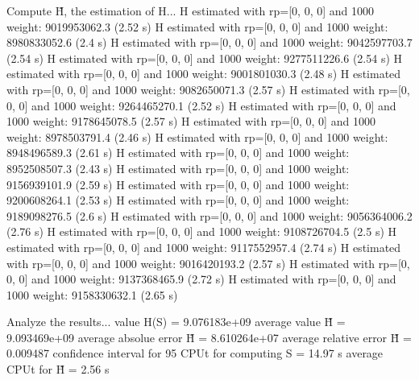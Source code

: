 Compute H̃, the estimation of H...
  H estimated with rp=[0, 0, 0] and 1000 weight:  9019953062.3  (2.52 s)
  H estimated with rp=[0, 0, 0] and 1000 weight:  8980833052.6  (2.4 s)
  H estimated with rp=[0, 0, 0] and 1000 weight:  9042597703.7  (2.54 s)
  H estimated with rp=[0, 0, 0] and 1000 weight:  9277511226.6  (2.54 s)
  H estimated with rp=[0, 0, 0] and 1000 weight:  9001801030.3  (2.48 s)
  H estimated with rp=[0, 0, 0] and 1000 weight:  9082650071.3  (2.57 s)
  H estimated with rp=[0, 0, 0] and 1000 weight:  9264465270.1  (2.52 s)
  H estimated with rp=[0, 0, 0] and 1000 weight:  9178645078.5  (2.57 s)
  H estimated with rp=[0, 0, 0] and 1000 weight:  8978503791.4  (2.46 s)
  H estimated with rp=[0, 0, 0] and 1000 weight:  8948496589.3  (2.61 s)
  H estimated with rp=[0, 0, 0] and 1000 weight:  8952508507.3  (2.43 s)
  H estimated with rp=[0, 0, 0] and 1000 weight:  9156939101.9  (2.59 s)
  H estimated with rp=[0, 0, 0] and 1000 weight:  9200608264.1  (2.53 s)
  H estimated with rp=[0, 0, 0] and 1000 weight:  9189098276.5  (2.6 s)
  H estimated with rp=[0, 0, 0] and 1000 weight:  9056364006.2  (2.76 s)
  H estimated with rp=[0, 0, 0] and 1000 weight:  9108726704.5  (2.5 s)
  H estimated with rp=[0, 0, 0] and 1000 weight:  9117552957.4  (2.74 s)
  H estimated with rp=[0, 0, 0] and 1000 weight:  9016420193.2  (2.57 s)
  H estimated with rp=[0, 0, 0] and 1000 weight:  9137368465.9  (2.72 s)
  H estimated with rp=[0, 0, 0] and 1000 weight:  9158330632.1  (2.65 s)

Analyze the results...
  value H(S)                  = 9.076183e+09 
  average value H̃             = 9.093469e+09 
  average absolue error H̃     = 8.610264e+07 
  average relative error H̃    = 0.009487 
  confidence interval for 95%
  CPUt for computing S         = 14.97 s
  average CPUt for H̃           = 2.56 s

